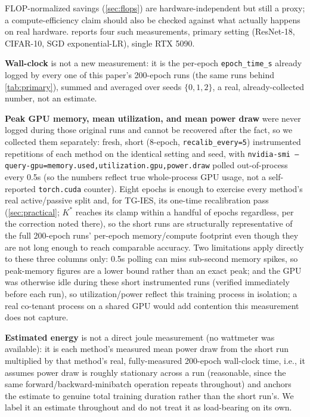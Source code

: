 \documentclass{article}
\theoremstyle{plain}
\theoremstyle{definition}
\theoremstyle{remark}
\begin{document}
FLOP-normalized savings (\cref{sec:flops}) are hardware-independent but still a proxy; a compute-efficiency claim should also be checked against what actually happens on real hardware.  reports four such measurements, primary setting (ResNet-18, CIFAR-10, SGD exponential-LR), single RTX 5090.

\textbf{Wall-clock} is not a new measurement: it is the per-epoch \texttt{epoch\_time\_s} already logged by every one of this paper's 200-epoch runs (the same runs behind \cref{tab:primary}), summed and averaged over seeds $\{0,1,2\}$, a real, already-collected number, not an estimate.

\textbf{Peak GPU memory, mean utilization, and mean power draw} were never logged during those original runs and cannot be recovered after the fact, so we collected them separately: fresh, short (8-epoch, \texttt{recalib\_every=5}) instrumented repetitions of each method on the identical setting and seed, with \texttt{nvidia-smi --query-gpu=memory.used,utilization.gpu,power.draw} polled out-of-process every 0.5s (so the numbers reflect true whole-process GPU usage, not a self-reported \texttt{torch.cuda} counter). Eight epochs is enough to exercise every method's real active/passive split and, for TG-IES, its one-time recalibration pass (\cref{sec:practical}; $K^*$ reaches its clamp within a handful of epochs regardless, per the correction noted there), so the short runs are structurally representative of the full 200-epoch runs' per-epoch memory/compute footprint even though they are not long enough to reach comparable accuracy. Two limitations apply directly to these three columns only: 0.5s polling can miss sub-second memory spikes, so peak-memory figures are a lower bound rather than an exact peak; and the GPU was otherwise idle during these short instrumented runs (verified immediately before each run), so utilization/power reflect this training process in isolation; a real co-tenant process on a shared GPU would add contention this measurement does not capture.

\textbf{Estimated energy} is not a direct joule measurement (no wattmeter was available): it is each method's measured mean power draw from the short run multiplied by that method's real, fully-measured 200-epoch wall-clock time, i.e., it assumes power draw is roughly stationary across a run (reasonable, since the same forward/backward-minibatch operation repeats throughout) and anchors the estimate to genuine total training duration rather than the short run's. We label it an estimate throughout and do not treat it as load-bearing on its own.
\end{document}
